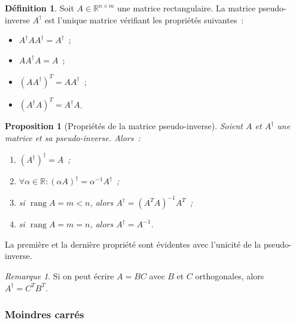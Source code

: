 \documentclass{article}
\newtheorem{prp}[thm]{Proposition}
\theoremstyle{definition}
\newtheorem{déf}[thm]{Définition}
\theoremstyle{remark}
\newtheorem*{rmq}{Remarque}
\DeclareMathOperator{\rg}{rang}  %
\newcommand{\R}{\mathbb R}
\begin{document}
		\begin{déf} Soit $A \in \R^{n \times m}$ une matrice rectangulaire. La matrice pseudo-inverse $A^\dagger$ est l'unique matrice vérifiant les
		propriétés suivantes~:
		\begin{itemize}
			\item $A^\dagger A A^\dagger = A^\dagger$~;
			\item $A A^\dagger A = A$~;
			\item $(AA^\dagger)^T = AA^\dagger$~;
			\item $(A^\dagger A)^T = A^\dagger A$.
		\end{itemize}
		\end{déf}

		\begin{prp}[Propriétés de la matrice pseudo-inverse] Soient $A$ et $A^\dagger$ une matrice et sa pseudo-inverse. Alors~:
		\begin{enumerate}
			\item $(A^\dagger)^\dagger = A$~;
			\item $\forall \alpha \in \R : (\alpha A)^\dagger = \alpha^{-1}A^\dagger$~;
			\item si $\rg A = m < n$, alors $A^\dagger = (A^TA)^{-1}A^T$~;
			\item si $\rg A = m = n$, alors $A^\dagger = A^{-1}$.
		\end{enumerate}
		\end{prp}

		La première et la dernière propriété sont évidentes avec l'unicité de la pseudo-inverse.

		\begin{rmq} Si on peut écrire $A = BC$ avec $B$ et $C$ orthogonales, alors $A^\dagger = C^TB^T$. \end{rmq}

		\subsubsection{Moindres carrés}
\end{document}
